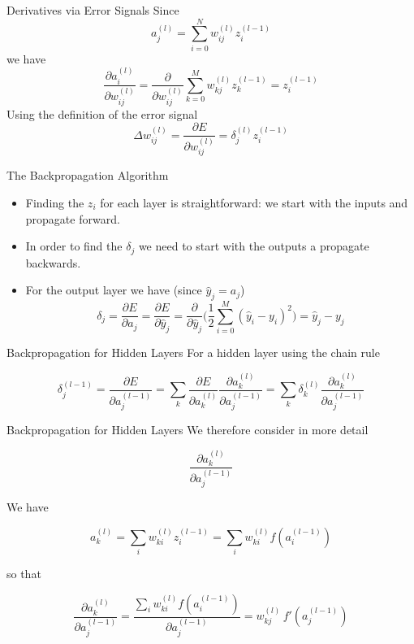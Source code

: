 \documentclass{beamer}
\begin{document}
\begin{frame}[fragile]{Derivatives via Error Signals}
Since
$$
a_j^{(l)} = \sum_{i=0}^N w_{ij}^{(l)}z_i^{(l-1)}
$$
we have
$$
\frac{\partial a_i^{(l)}}{\partial w_{ij}^{(l)}} =
\frac{\partial}{\partial w_{ij}^{(l)}}\sum_{k=0}^M w_{kj}^{(l)}z_k^{(l-1)} =
z_i^{(l-1)}
$$
Using the definition of the error signal
$$
\Delta w_{ij}^{(l)} =
\frac{\partial E}{\partial w_{ij}^{(l)}} =
\delta_j^{(l)} z_i^{(l-1)}
$$
\end{frame}

\begin{frame}[fragile]{The Backpropagation Algorithm}
\begin{itemize}
\item
Finding the $z_i$ for each layer is straightforward: we start with the
inputs and propagate forward.
\item
In order to find the $\delta_j$ we need
to start with the outputs a propagate backwards.
\item
For the output layer we have (since $\hat{y}_j = a_j$)
$$
\delta_j = \frac{\partial E}{\partial a_j} = \frac{\partial E}{\partial \hat{y}_j} = \frac{\partial}{\partial \hat{y}_j}\bigg(\frac{1}{2}\sum_{i=0}^M (\hat{y}_i - y_i)^2\bigg) = \hat{y}_j - y_j
$$
\end{itemize}
\end{frame}

\begin{frame}[fragile]{Backpropagation for Hidden Layers}
For a hidden layer using the chain rule

$$
\delta_j^{(l-1)} = \frac{\partial E}{\partial a_j^{(l-1)}} =
\sum_k \frac{\partial E}{\partial a_k^{(l)}}\frac{\partial
  a_k^{(l)}}{\partial a_j^{(l-1)}} =
\sum_k \delta_k^{(l)}\frac{\partial a_k^{(l)}}{\partial a_j^{(l-1)}}
$$
\end{frame}

\begin{frame}[fragile]{Backpropagation for Hidden Layers}
We therefore consider in more detail

$$
\frac{\partial a_k^{(l)}}{\partial a_j^{(l-1)}}
$$

We have

$$
a_k^{(l)} = \sum_i w_{ki}^{(l)}z_i^{(l-1)} = \sum_i w_{ki}^{(l)} f(a_i^{(l-1)})
$$

so that

$$
\frac{\partial a_k^{(l)}}{\partial a_j^{(l-1)}} =
\frac{\sum_i w_{ki}^{(l)} f(a_i^{(l-1)})}{\partial a_j^{(l-1)}} =
w_{kj}^{(l)}\,f'(a_j^{(l-1)})
$$
\end{frame}
\end{document}
